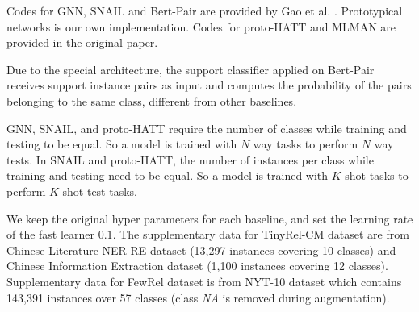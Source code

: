 Codes for GNN, SNAIL and Bert-Pair are provided by Gao et al. . Prototypical networks is our own implementation. Codes for proto-HATT and MLMAN are provided in the original paper.

Due to the special architecture, the support classifier applied on Bert-Pair receives support instance pairs as input and computes the probability of the pairs belonging to the same class, different from other baselines.

GNN, SNAIL, and proto-HATT require the number of classes while training and testing to be equal. So a model is trained with $N$ way tasks to perform $N$ way tests. In SNAIL and proto-HATT, the number of instances per class while training and testing need to be equal. So a model is trained with $K$ shot tasks to perform $K$ shot test tasks.

We keep the original hyper parameters for each baseline, and set the learning rate of the fast learner $0.1$. The supplementary data for TinyRel-CM dataset are from Chinese Literature NER RE dataset \cite{dnerre} (13,297 instances covering 10 classes) and Chinese Information Extraction dataset \cite{augdata} (1,100 instances covering 12 classes). Supplementary data for FewRel dataset is from NYT-10 dataset \cite{NYTdataset} which contains 143,391 instances over 57 classes (class \emph{NA} is removed during augmentation).

